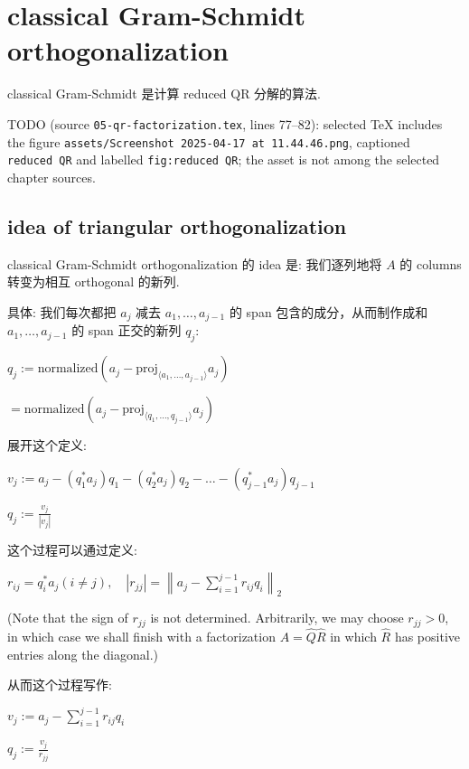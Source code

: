 \section{classical Gram-Schmidt orthogonalization}

classical Gram-Schmidt 是计算 reduced QR 分解的算法.

TODO (source \texttt{05-qr-factorization.tex}, lines 77--82): selected TeX includes the figure \texttt{assets/Screenshot\ 2025-04-17\ at\ 11.44.46.png}, captioned \texttt{reduced\ QR} and labelled \texttt{fig:reduced\ QR}; the asset is not among the selected chapter sources.

\subsection{idea of triangular orthogonalization}

classical Gram-Schmidt orthogonalization 的 idea 是: 我们逐列地将 \(A\) 的 columns 转变为相互 orthogonal 的新列.

具体: 我们每次都把 \(a_{j}\) 减去 \(a_{1},\ldots,a_{j - 1}\) 的 span 包含的成分，从而制作成和 \(a_{1},\ldots,a_{j - 1}\) 的 span 正交的新列 \(q_{j}\):

\(q_{j} := \text{normalized}\left( {a_{j} - \text{proj}_{\langle{a_{1},\ldots,a_{j - 1}}\rangle}a_{j}} \right)\)

\(= \text{normalized}\left( {a_{j} - \text{proj}_{\langle{q_{1},\ldots,q_{j - 1}}\rangle}a_{j}} \right)\)

展开这个定义:

\(v_{j} := a_{j} - \left( {q_{1}^{\ast}a_{j}} \right)q_{1} - \left( {q_{2}^{\ast}a_{j}} \right)q_{2} - \ldots - \left( {q_{j - 1}^{\ast}a_{j}} \right)q_{j - 1}\)

\(q_{j} := \frac{v_{j}}{\left| v_{j} \right|}\)

这个过程可以通过定义:

\(r_{ij} = q_{i}^{\ast}a_{j}\left( {i \neq j} \right),\quad\left| r_{jj} \right| = \left\| {a_{j} - \sum_{i = 1}^{j - 1}r_{ij}q_{i}} \right\|_{2}\)

(Note that the sign of \(r_{jj}\) is not determined. Arbitrarily, we may choose \(r_{jj} > 0\), in which case we shall finish with a factorization \(A = \widehat{Q}\widehat{R}\) in which \(\widehat{R}\) has positive entries along the diagonal.)

从而这个过程写作:

\(v_{j} := a_{j} - \sum_{i = 1}^{j - 1}r_{ij}q_{i}\)

\(q_{j} := \frac{v_{j}}{r_{jj}}\)


